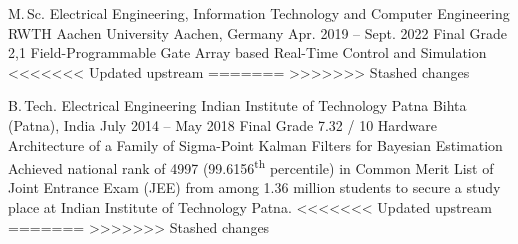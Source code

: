
\begin{cveducation}

\cvschool
	{M.\,Sc.} %
	{Electrical Engineering, Information Technology and Computer Engineering} %
	{RWTH Aachen University} %
	{Aachen, Germany  {\acvHeaderIconSep{}} {} } %
	{Apr. 2019 -- Sept. 2022  {\acvHeaderIconSep{}} {} } %
	{Final Grade 2,1  {\acvHeaderIconSep{}} {} } %
	{Field-Programmable Gate Array based Real-Time Control and Simulation} %
	{}
<<<<<<< Updated upstream
=======
>>>>>>> Stashed changes

\cvschool
	{B.\,Tech.} %
	{Electrical Engineering} %
	{Indian Institute of Technology Patna} %
	{Bihta (Patna), India  {\acvHeaderIconSep{}} {} } %
	{July 2014 -- May 2018  {\acvHeaderIconSep{}} {} } %
	{Final Grade 7.32 / 10  {\acvHeaderIconSep{}} {} } %
	{Hardware Architecture of a Family of Sigma-Point Kalman Filters for Bayesian Estimation} %
	{ {\acvHeaderIconSep} {}Achieved national rank of 4997 (99.6156\textsuperscript{th} percentile) in Common Merit List of Joint Entrance Exam (JEE) from among 1.36 million students to secure a study place at Indian Institute of Technology Patna.} %
<<<<<<< Updated upstream
=======
>>>>>>> Stashed changes


\end{cveducation}
